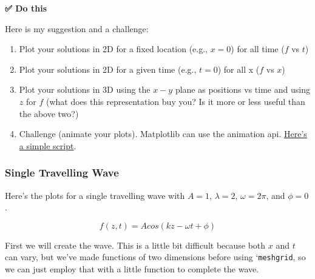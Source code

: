 \textbf{✅ Do this}

Here is my suggestion and a challenge:

\begin{enumerate}
\def\labelenumi{\arabic{enumi}.}
\tightlist
\item
  Plot your solutions in 2D for a fixed location (e.g., \(x=0\)) for all
  time (\(f\) vs \(t\))
\item
  Plot your solutions in 2D for a given time (e.g., \(t=0\)) for all x
  (\(f\) vs \(x\))
\item
  Plot your solutions in 3D using the \(x-y\) plane as positions vs time
  and using \(z\) for \(f\) (what does this representation buy you? Is
  it more or less useful than the above two?)
\item
  Challenge (animate your plots). Matplotlib can use the animation api.
  \href{https://matplotlib.org/2.0.2/examples/animation/simple_anim.html}{Here's
  a simple script}.
\end{enumerate}

\begin{Shaded}
\begin{Highlighting}[]
\OperatorTok{\%}

\end{Highlighting}
\end{Shaded}

\subsubsection{Single Travelling Wave}\label{single-travelling-wave}

Here's the plots for a single travelling wave with \(A=1\),
\(\lambda = 2\), \(\omega=2\pi\), and \(\phi=0\).

\[f(z,t) = A cos(kz-\omega t+\phi)\]

First we will create the wave. This is a little bit difficult because
both \(x\) and \(t\) can vary, but we've made functions of two
dimensions before using `\texttt{meshgrid}, so we can just employ that
with a little function to complete the wave.

